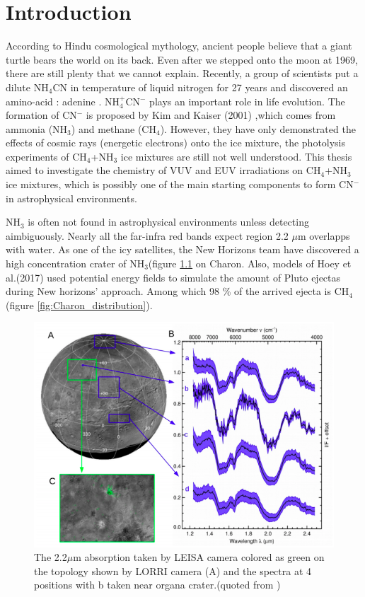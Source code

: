 \chapter{\protect Introduction}
\label{introduction}

According to Hindu cosmological mythology, ancient people believe that a giant turtle bears the world on its back. Even after we stepped onto the moon at 1969, there are still plenty that we cannot explain. Recently, a group of scientists put a dilute NH$_4$CN in temperature of liquid nitrogen for 27 years and discovered an amino-acid : adenine \cite{miyakawa2002cold}. NH$_4^+$CN$^-$ plays an important role in life evolution. The formation of CN$^-$ is proposed by Kim and Kaiser (2001) \cite{kim},which comes from ammonia (NH$_3$) and methane (CH$_4$). However, they have only demonstrated the effects of cosmic rays (energetic electrons) onto the ice mixture, the photolysis experiments of CH$_4$+NH$_3$ ice mixtures are still not well understood. This thesis aimed to investigate the chemistry of VUV and EUV irradiations on CH$_4$+NH$_3$ ice mixtures, which is possibly one of the main starting components to form CN$^-$ in astrophysical environments.

NH$_3$ is often not found in astrophysical environments unless detecting aimbiguously. Nearly all the far-infra red bands expect region 2.2 $\mu$m overlapps with water. As one of the icy satellites, the New Horizons team have discovered a high concentration crater of NH$_3$(figure \ref{fig:Charon_IR} on Charon\cite{grundy2016surface}. Also, models of Hoey et al.(2017)\cite{hoey2017rarefied} used potential energy fields to simulate the amount of Pluto ejectas during New horizons' approach. Among which 98 \% of the arrived ejecta is CH$_4$ (figure \ref{fig:Charon_distribution}).


\begin{figure}
\centering
\includegraphics[width=\textwidth]{figures/chapter1/IR.png}
\caption{The 2.2$\mu$m absorption taken by LEISA camera colored as green on the topology shown by LORRI camera (A) and the spectra at 4 positions with b taken near organa crater.(quoted from \cite{grundy2016surface})}
\label{fig:Charon_IR}
\end{figure}

